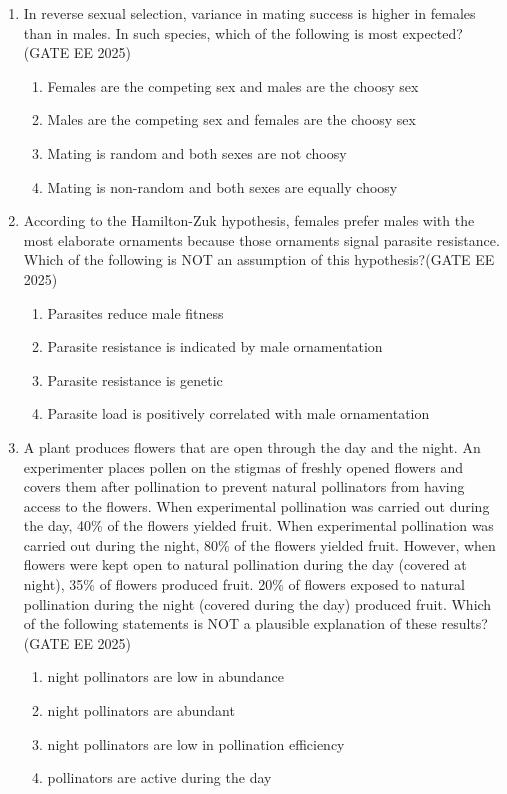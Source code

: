 \begin{enumerate}[leftmargin=*,label=\textbf{Q.\arabic*},resume]
\item In reverse sexual selection, variance in mating success is higher in females than in males. In such species, which of the following is most expected?\hfill {(GATE EE 2025)}
\begin{multicols}{2}
\begin{enumerate}
\item Females are the competing sex and males are the choosy sex
\item Males are the competing sex and females are the choosy sex
\item Mating is random and both sexes are not choosy
\item Mating is non-random and both sexes are equally choosy
\end{enumerate}
\end{multicols}

\item According to the Hamilton-Zuk hypothesis, females prefer males with the most elaborate ornaments because those ornaments signal parasite resistance. Which of the following is NOT an assumption of this hypothesis?\hfill {(GATE EE 2025)}
\begin{multicols}{2}
\begin{enumerate}
\item Parasites reduce male fitness
\item Parasite resistance is indicated by male ornamentation
\item Parasite resistance is genetic
\item Parasite load is positively correlated with male ornamentation
\end{enumerate}
\end{multicols}

\item A plant produces flowers that are open through the day and the night. An experimenter places pollen on the stigmas of freshly opened flowers and covers them after pollination to prevent natural pollinators from having access to the flowers. When experimental pollination was carried out during the day, 40\% of the flowers yielded fruit. When experimental pollination was carried out during the night, 80\% of the flowers yielded fruit. However, when flowers were kept open to natural pollination during the day (covered at night), 35\% of flowers produced fruit. 20\% of flowers exposed to natural pollination during the night (covered during the day) produced fruit. Which of the following statements is NOT a plausible explanation of these results?\hfill {(GATE EE 2025)}
\begin{multicols}{2}
\begin{enumerate}
\item night pollinators are low in abundance
\item night pollinators are abundant
\item night pollinators are low in pollination efficiency
\item pollinators are active during the day
\end{enumerate}
\end{multicols}


\end{enumerate}
